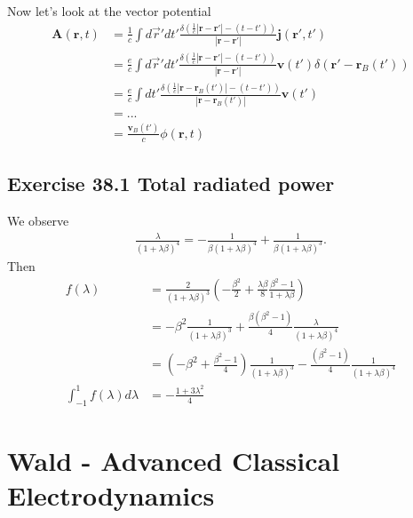 \documentclass[../main.tex]{subfiles}
\begin{document}
Now let's look at the vector potential
\begin{align}
\mathbf{A}(\mathbf{r},t)
&=\frac{1}{c}\int d\vec{r}'dt'\frac{\delta(\frac{1}{c}|\mathbf{r}-\mathbf{r}'|-(t-t'))}{|\mathbf{r}-\mathbf{r}'|}\mathbf{j}(\mathbf{r}',t')\\
&=\frac{e}{c}\int d\vec{r}'dt'\frac{\delta(\frac{1}{c}|\mathbf{r}-\mathbf{r}'|-(t-t'))}{|\mathbf{r}-\mathbf{r}'|}\mathbf{v}(t')\delta(\mathbf{r}'-\mathbf{r}_B(t'))\\
&=\frac{e}{c}\int dt'\frac{\delta(\frac{1}{c}|\mathbf{r}-\mathbf{r}_B(t')|-(t-t'))}{|\mathbf{r}-\mathbf{r}_B(t')|}\mathbf{v}(t')\\
&=...\\
&=\frac{\mathbf{v}_B(t')}{c}\phi(\mathbf{r},t)
\end{align}




\subsection{Exercise 38.1 Total radiated power}
We observe
\begin{align}
\frac{\lambda}{(1+\lambda\beta)^4}=-\frac{1}{\beta(1+\lambda\beta)^4}+\frac{1}{\beta(1+\lambda\beta)^3}.    
\end{align}
Then
\begin{align}
    f(\lambda)&=\frac{2}{(1+\lambda\beta)^3}\left(-\frac{\beta^2}{2}+\frac{\lambda\beta}{8}\frac{\beta^2-1}{1+\lambda\beta}\right)\\
    &=-\beta^2\frac{1}{(1+\lambda\beta)^3}+\frac{\beta(\beta^2-1)}{4}\frac{\lambda}{(1+\lambda\beta)^4}\\
    &=\left(-\beta^2+\frac{\beta^2-1}{4}\right)\frac{1}{(1+\lambda\beta)^3}-\frac{(\beta^2-1)}{4}\frac{1}{(1+\lambda\beta)^4}\\
    \int_{-1}^1f(\lambda)d\lambda&=-\frac{1+3\lambda^2}{4}
\end{align}

\section{{\sc Wald} - Advanced Classical Electrodynamics}
\end{document}
